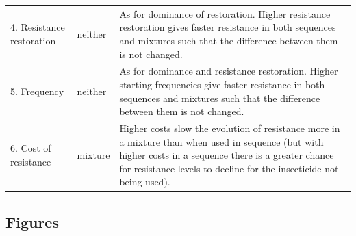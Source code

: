 \documentclass[11pt,]{article}
\begin{document}
\begin{longtable}[]{@{}lll@{}}
\begin{minipage}[t]{0.28\columnwidth}
4. Resistance restoration\strut
\end{minipage} & \begin{minipage}[t]{0.10\columnwidth}\raggedright\strut
neither\strut
\end{minipage} & \begin{minipage}[t]{0.53\columnwidth}\raggedright\strut
As for dominance of restoration. Higher resistance restoration gives
faster resistance in both sequences and mixtures such that the
difference between them is not changed.\strut
\end{minipage}\tabularnewline
\begin{minipage}[t]{0.28\columnwidth}\raggedright\strut
5. Frequency\strut
\end{minipage} & \begin{minipage}[t]{0.10\columnwidth}\raggedright\strut
neither\strut
\end{minipage} & \begin{minipage}[t]{0.53\columnwidth}\raggedright\strut
As for dominance and resistance restoration. Higher starting frequencies
give faster resistance in both sequences and mixtures such that the
difference between them is not changed.\strut
\end{minipage}\tabularnewline
\begin{minipage}[t]{0.28\columnwidth}\raggedright\strut
6. Cost of resistance\strut
\end{minipage} & \begin{minipage}[t]{0.10\columnwidth}\raggedright\strut
mixture\strut
\end{minipage} & \begin{minipage}[t]{0.53\columnwidth}\raggedright\strut
Higher costs slow the evolution of resistance more in a mixture than
when used in sequence (but with higher costs in a sequence there is a
greater chance for resistance levels to decline for the insecticide not
being used).\strut
\end{minipage}\tabularnewline
\bottomrule
\end{longtable}

\pagebreak

\subsection{Figures}\label{figures}
\end{document}
